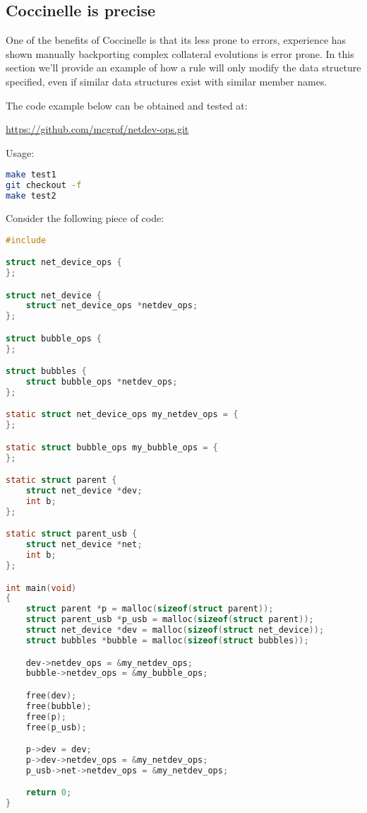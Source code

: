 \documentclass[a4paper,10pt]{article}
\begin{document}
\subsection{Coccinelle is precise}

One of the benefits of Coccinelle is that its less prone to errors,
experience has shown manually backporting complex collateral evolutions
is error prone. In this section we'll provide an example of how a rule
will only modify the data structure specified, even if similar data
structures exist with similar member names.

The code example below can be obtained and tested at:

\url{https://github.com/mcgrof/netdev-ops.git}

Usage:

\begin{lstlisting}[language=bash]
make test1
git checkout -f
make test2
\end{lstlisting}

Consider the following piece of code:

\begin{lstlisting}[language=C]
#include

struct net_device_ops {
};

struct net_device {
	struct net_device_ops *netdev_ops;
};

struct bubble_ops {
};

struct bubbles {
	struct bubble_ops *netdev_ops;
};

static struct net_device_ops my_netdev_ops = {
};

static struct bubble_ops my_bubble_ops = {
};

static struct parent {
	struct net_device *dev;
	int b;
};

static struct parent_usb {
	struct net_device *net;
	int b;
};

int main(void)
{
	struct parent *p = malloc(sizeof(struct parent));
	struct parent_usb *p_usb = malloc(sizeof(struct parent));
	struct net_device *dev = malloc(sizeof(struct net_device));
	struct bubbles *bubble = malloc(sizeof(struct bubbles));

	dev->netdev_ops = &my_netdev_ops;
	bubble->netdev_ops = &my_bubble_ops;

	free(dev);
	free(bubble);
	free(p);
	free(p_usb);

	p->dev = dev;
	p->dev->netdev_ops = &my_netdev_ops;
	p_usb->net->netdev_ops = &my_netdev_ops;

	return 0;
}
\end{lstlisting}
\end{document}
